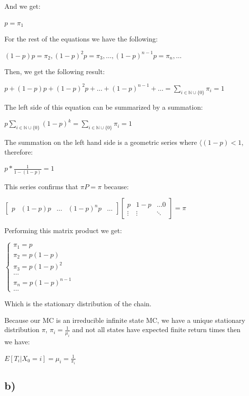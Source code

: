 \documentclass[
]{article}
\begin{document}
And we get:

\(p = \pi_{1}\)

For the rest of the equations we have the following:

\((1 - p)p = \pi_{2}, (1 - p)^{2} p = \pi_{3}, \dots, (1 - p)^{n-1} p = \pi_{n}, \dots\)

Then, we get the following result:

\(p + (1-p)p + (1-p)^{2} p + \dots + (1-p)^{n-1} + \dots = \sum_{i \in \mathbb{N} \cup \{0\}} \pi_{i} = 1\)

The left side of this equation can be summarized by a summation:

\(p \sum_{i \in \mathbb{N} \cup \{0\}} (1-p)^{k} = \sum_{i \in \mathbb{N} \cup \{0\}} \pi_{i} = 1\)

The summation on the left hand side is a geometric series where
\(\langle{(1-p)} < 1\), therefore:

\(p * \frac{1}{1 - (1 - p)} = 1\)

This series confirms that \(\pi P = \pi\) because:

\(\begin{bmatrix} p & (1 - p)p & \dots & (1 - p)^{n} p & \dots \end{bmatrix} \begin{bmatrix} p & 1-p & \dots 0 \\ \vdots & \vdots & \ddots \end{bmatrix} = \pi\)

Performing this matrix product we get:

\(\begin{cases} \pi_{1} = p \\ \pi_{2} = p (1-p) \\ \pi_{3} = p (1-p)^{2} \\ \dots \\ \pi_{n} = p (1-p)^{n-1} \\ \dots \end{cases}\)

Which is the stationary distribution of the chain.

Because our MC is an irreducible infinite state MC, we have a unique
stationary distribution \(\pi\), \(\pi_{i} = \frac{1}{\mu_{i}}\) and not
all states have expected finite return times then we have:

\(E[T_{i}|X_{0} = i] = \mu_{i} = \frac{1}{\pi_{i}}\)

\newpage

\hypertarget{b-1}{%
\subsection{b)}\label{b-1}}
\end{document}
